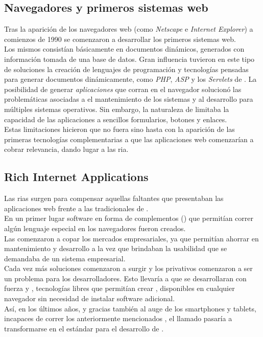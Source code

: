 \subsection{Navegadores y primeros sistemas web}
\label{subsec:history:about_web:web}

Tras la aparición de los navegadores web (como \emph{Netscape} e
\emph{Internet Explorer}) a comienzos de 1990 se comenzaron a desarrollar los 
primeros sistemas web.\\
Los mismos consistían básicamente en documentos dinámicos, generados con 
información tomada de una base de datos. Gran influencia tuvieron en este tipo 
de soluciones la creación de lenguajes de programación y tecnologías pensadas 
para generar documentos \html dinámicamente, como \emph{PHP}, \emph{ASP} y los 
\emph{Servlets} de \java {}. La posibilidad de 
generar \emph{aplicaciones} que corran en el navegador solucionó las
problemáticas asociadas a el mantenimiento de los sistemas y al desarrollo para 
múltiples sistemas operativos. Sin embargo, la naturaleza de \html limitaba la 
capacidad de las aplicaciones a sencillos formularios, botones y enlaces.\\
Estas limitaciones hicieron que no fuera sino hasta con la aparición de las 
primeras tecnologías complementarias a \html que las aplicaciones web 
comenzarían a cobrar relevancia, dando lugar a las \ac{ria}.

\subsection{Rich Internet Applications}
\label{subsec:history:about_web:rias}

Las \glspl{ria} surgen para compensar aquellas faltantes que presentaban las 
aplicaciones web frente a las tradicionales de \clientserver.\\
En un primer lugar software en forma de complementos (\plugins) que permitían
correr algún lenguaje especial en los navegadores fueron creados.\\
Las \ria comenzaron a copar los mercados empresariales, ya que permitían ahorrar
en mantenimiento y desarrollo a la vez que brindaban la usabilidad que se 
demandaba de un sistema empresarial.\\
Cada vez más soluciones comenzaron a surgir y los \plugins privativos 
comenzaron a ser un problema para los desarrolladores. Esto llevaría a que se 
desarrollaran con fuerza \css y \js, tecnologías libres que permitían crear 
\rias, disponibles en cualquier navegador sin necesidad de instalar software 
adicional.\\
Así, en los últimos años, y gracias también al auge de los smartphones y 
tablets, incapaces de correr los anteriormente mencionados \plugins, el llamado 
\htmlv pasaría a transformarse en el estándar para el desarrollo de \rias
{}.\\

